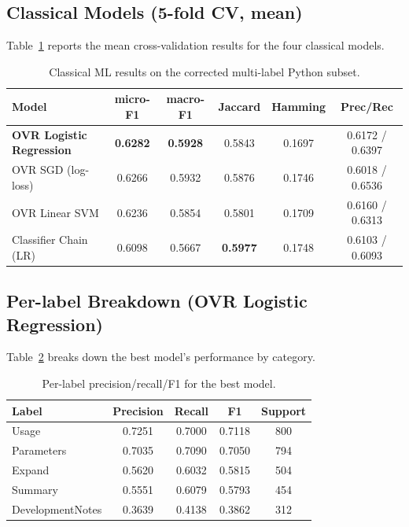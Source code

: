 \documentclass[11pt,a4paper]{article}
\begin{document}
\subsection{Classical Models (5-fold CV, mean)}

Table~\ref{tab:classical} reports the mean cross-validation results for the four
classical models.

\begin{table}[H]
\centering
\caption{Classical ML results on the corrected multi-label Python subset.}
\label{tab:classical}
\begin{tabular}{lccccc}
\toprule
\textbf{Model} & \textbf{micro-F1} & \textbf{macro-F1} & \textbf{Jaccard} & \textbf{Hamming} & \textbf{Prec/Rec} \\
\midrule
\textbf{OVR Logistic Regression} & \textbf{0.6282} & \textbf{0.5928} & 0.5843 & 0.1697 & 0.6172 / 0.6397 \\
OVR SGD (log-loss)               & 0.6266 & 0.5932 & 0.5876 & 0.1746 & 0.6018 / 0.6536 \\
OVR Linear SVM                   & 0.6236 & 0.5854 & 0.5801 & 0.1709 & 0.6160 / 0.6313 \\
Classifier Chain (LR)            & 0.6098 & 0.5667 & \textbf{0.5977} & 0.1748 & 0.6103 / 0.6093 \\
\bottomrule
\end{tabular}
\end{table}

\subsection{Per-label Breakdown (OVR Logistic Regression)}

Table~\ref{tab:perlabel} breaks down the best model's performance by category.

\begin{table}[H]
\centering
\caption{Per-label precision/recall/F1 for the best model.}
\label{tab:perlabel}
\begin{tabular}{lcccc}
\toprule
\textbf{Label} & \textbf{Precision} & \textbf{Recall} & \textbf{F1} & \textbf{Support} \\
\midrule
Usage            & 0.7251 & 0.7000 & 0.7118 & 800 \\
Parameters       & 0.7035 & 0.7090 & 0.7050 & 794 \\
Expand           & 0.5620 & 0.6032 & 0.5815 & 504 \\
Summary          & 0.5551 & 0.6079 & 0.5793 & 454 \\
DevelopmentNotes & 0.3639 & 0.4138 & 0.3862 & 312 \\
\bottomrule
\end{tabular}
\end{table}
\end{document}
